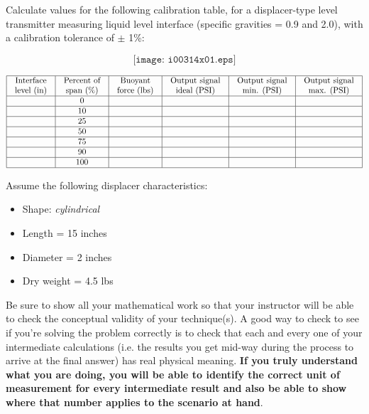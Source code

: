 

Calculate values for the following calibration table, for a displacer-type level transmitter measuring liquid level interface (specific gravities = 0.9 and 2.0), with a calibration tolerance of $\pm$ 1\%:

$$\texttt{[image: i00314x01.eps]}$$


$$\vbox{\offinterlineskip
\halign{\strut
\vrule \quad\hfil # \ \hfil & 
\vrule \quad\hfil # \ \hfil & 
\vrule \quad\hfil # \ \hfil & 
\vrule \quad\hfil # \ \hfil & 
\vrule \quad\hfil # \ \hfil & 
\vrule \quad\hfil # \ \hfil \vrule \cr
\noalign{\hrule}
%
Interface & Percent of & Buoyant & Output signal & Output signal & Output signal \cr
%
level (in) & span (\%) & force (lbs) & ideal (PSI) & min. (PSI) & max. (PSI) \cr
%
\noalign{\hrule}
%
  & 0 &  &  &  &  \cr
%
\noalign{\hrule}
%
  & 10 &  &  &  &  \cr
%
\noalign{\hrule}
%
  & 25 &  &  &  &  \cr
%
\noalign{\hrule}
%
  & 50 &  &  &  &  \cr
%
\noalign{\hrule}
%
  & 75 &  &  &  &  \cr
%
\noalign{\hrule}
%
  & 90 &  &  &  &  \cr
%
\noalign{\hrule}
%
  & 100 &  &  &  &  \cr
%
\noalign{\hrule}
} %
}$$ %

Assume the following displacer characteristics:

\begin{itemize}
\item{} Shape: {\it cylindrical}
\item{} Length = 15 inches
\item{} Diameter = 2 inches
\item{} Dry weight = 4.5 lbs
\end{itemize}

\vskip 10pt

Be sure to show all your mathematical work so that your instructor will be able to check the conceptual validity of your technique(s).  A good way to check to see if you're solving the problem correctly is to check that each and every one of your intermediate calculations (i.e. the results you get mid-way during the process to arrive at the final answer) has real physical meaning.  {\bf If you truly understand what you are doing, you will be able to identify the correct unit of measurement for every intermediate result and also be able to show where that number applies to the scenario at hand}.


